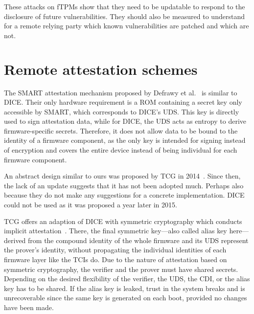 These attacks on \acp{fTPM} show that they need to be updatable to respond to the disclosure of future vulnerabilities.
They should also be measured to understand for a remote relying party which known vulnerabilities are patched and which are not.

\section{Remote attestation schemes}



The SMART attestation mechanism proposed by Defrawy et al.~\cite{EURECOM+3536} is similar to \ac{DICE}.
Their only hardware requirement is a ROM containing a secret key only accessible by SMART, which corresponds to DICE's \ac{UDS}.
This key is directly used to sign attestation data, while for \ac{DICE}, the \ac{UDS} acts as entropy to derive firmware-specific secrets.
Therefore, it does not allow data to be bound to the identity of a firmware component, as the only key is intended for signing instead of encryption and covers the entire device instead of being individual for each firmware component.

An abstract design similar to ours was proposed by \ac{TCG} in 2014~\cite{tcgTpmMobile}.
Since then, the lack of an update suggests that it has not been adopted much. 
Perhaps also because they do not make any suggestions for a concrete implementation.
\Ac{DICE} could not be used as it was proposed a year later in 2015.

\Ac{TCG} offers an adaption of \ac{DICE} with symmetric cryptography which conducts implicit attestation~\cite{dice-symmetric-arch}.
There, the final symmetric key---also called alias key here---derived from the compound identity of the whole firmware and its \ac{UDS} represent the prover's identity, without propagating the individual identities of each firmware layer like the \acp{TCI} do.
Due to the nature of attestation based on symmetric cryptography, the verifier and the prover must have shared secrets.
Depending on the desired flexibility of the verifier, the \ac{UDS}, the \ac{CDI}, or the alias key has to be shared.
If the alias key is leaked, trust in the system breaks and is unrecoverable since the same key is generated on each boot, provided no changes have been made.

